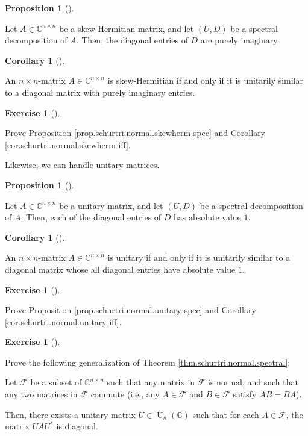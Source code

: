\documentclass[numbers=enddot,12pt,final,onecolumn,notitlepage]{scrartcl}%
\newcounter{exer}
\numberwithin{exer}{subsection}
\theoremstyle{definition}
\newtheorem{prop}[theo]{Proposition}
\newenvironment{proposition}[1][]
{\begin{prop}[#1]\begin{leftbar}}
{\end{leftbar}\end{prop}}
\newtheorem{coro}[theo]{Corollary}
\newenvironment{corollary}[1][]
{\begin{coro}[#1]\begin{leftbar}}
{\end{leftbar}\end{coro}}
\newtheorem{exmp}[exer]{Exercise}
\newenvironment{exercise}[1][]
{\begin{exmp}[#1]\begin{leftbar}}
{\end{leftbar}\end{exmp}}
\begin{document}
\begin{proposition}
\label{prop.schurtri.normal.skewherm-spec}Let $A\in\mathbb{C}^{n\times n}$ be
a skew-Hermitian matrix, and let $\left(  U,D\right)  $ be a spectral
decomposition of $A$. Then, the diagonal entries of $D$ are purely imaginary.
\end{proposition}

\begin{corollary}
\label{cor.schurtri.normal.skewherm-iff}An $n\times n$-matrix $A\in
\mathbb{C}^{n\times n}$ is skew-Hermitian if and only if it is unitarily
similar to a diagonal matrix with purely imaginary entries.
\end{corollary}

\begin{exercise}
\label{exe.schurtri.normal.skewherm} Prove Proposition
\ref{prop.schurtri.normal.skewherm-spec} and Corollary
\ref{cor.schurtri.normal.skewherm-iff}.
\end{exercise}

Likewise, we can handle unitary matrices.

\begin{proposition}
\label{prop.schurtri.normal.unitary-spec}Let $A\in\mathbb{C}^{n\times n}$ be a
unitary matrix, and let $\left(  U,D\right)  $ be a spectral decomposition of
$A$. Then, each of the diagonal entries of $D$ has absolute value $1$.
\end{proposition}

\begin{corollary}
\label{cor.schurtri.normal.unitary-iff}An $n\times n$-matrix $A\in
\mathbb{C}^{n\times n}$ is unitary if and only if it is unitarily similar to a
diagonal matrix whose all diagonal entries have absolute value $1$.
\end{corollary}

\begin{exercise}
\label{exe.schurtri.normal.unitary} Prove Proposition
\ref{prop.schurtri.normal.unitary-spec} and Corollary
\ref{cor.schurtri.normal.unitary-iff}.
\end{exercise}

\begin{exercise}
 Prove the following generalization of Theorem
\ref{thm.schurtri.normal.spectral}:

Let $\mathcal{F}$ be a subset of $\mathbb{C}^{n\times n}$ such that any matrix
in $\mathcal{F}$ is normal, and such that any two matrices in $\mathcal{F}$
commute (i.e., any $A\in\mathcal{F}$ and $B\in\mathcal{F}$ satisfy $AB=BA$).

Then, there exists a unitary matrix $U\in\operatorname*{U}\nolimits_{n}\left(
\mathbb{C}\right)  $ such that for each $A\in\mathcal{F}$, the matrix
$UAU^{\ast}$ is diagonal.
\end{exercise}
\end{document}
